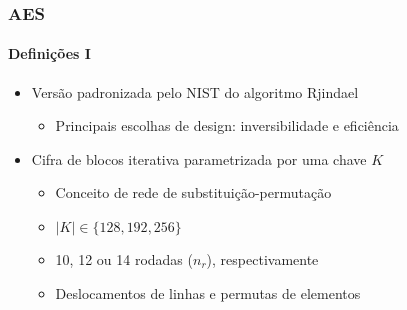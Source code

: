 \documentclass[12pt]{beamer}
\newcommand{\length}[1]{\vert #1 \vert}
\begin{document}
\begin{frame}
    \frametitle{AES}
    \framesubtitle{Definições I}
    \begin{itemize}
        \item Versão padronizada pelo NIST do algoritmo Rjindael \cite{Daemen:2002:DR:560131}
        \begin{itemize}
            \item Principais escolhas de design: inversibilidade e eficiência
        \end{itemize}
        \item Cifra de blocos iterativa parametrizada por uma chave $K$
        \begin{itemize}
            \item Conceito de rede de substituição-permutação
            \item $\length{K} \in \{128, 192, 256\}$
            \item 10, 12 ou 14 rodadas ($n_r$), respectivamente
            \item Deslocamentos de linhas e permutas de elementos
        \end{itemize}
    \end{itemize}
\end{frame}

      
		
\end{document}
